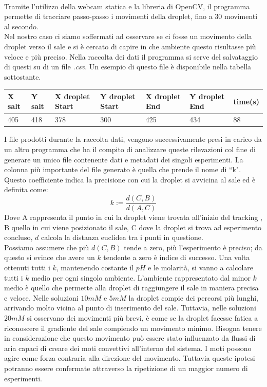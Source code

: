 \\Tramite l'utilizzo della webcam statica e la libreria di OpenCV, il programma permette di tracciare passo-passo i movimenti della droplet, fino a 30 movimenti al secondo. \\Nel nostro caso ci siamo soffermati ad osservare se ci fosse un movimento della droplet verso il sale e si è cercato di capire in che ambiente questo risultasse più veloce e più preciso. Nella raccolta dei dati il programma si serve del salvataggio di questi su di un file \emph{.csv}. Un esempio di questo file è disponibile nella tabella sottostante. 
\begin{center}
\begin{tabular}{lllllll}
X salt & Y salt & X droplet Start & Y droplet Start & X droplet End & Y droplet End & time(s) \\
\hline
405    & 418    & 378             & 300             & 425           & 434           & 88  
\end{tabular}
\end{center}
I file prodotti durante la raccolta dati, vengono successivamente presi in carico da un altro programma che ha il compito di analizzare queste rilevazioni col fine di generare un unico file contenente dati e metadati dei singoli esperimenti. La colonna più importante del file generato è quella che prende il nome di ``k". Questo coefficiente indica la precisione con cui la droplet si avvicina al sale ed è definita come:
\begin{equation} 	
	k := \frac { d(C,B) }{ d(A,C) }
\end{equation}
Dove A rappresenta il punto in cui la droplet viene trovata all'inizio del tracking , B quello in cui viene posizionato il sale, C dove la droplet si trova ad esperimento concluso, $d$ calcola la distanza euclidea tra i punti in questione. 
\\Possiamo assumere che più $d(C,B)$ tende a zero, più l'esperimento è preciso; da questo si evince che avere un $k$ tendente a zero è indice di successo. Una volta ottenuti tutti i $k$, mantenendo costante il $pH$ e le molarità, si vanno a calcolare tutti i $k$ medio per ogni singolo ambiente. L'ambiente rappresentato dal minor $k$ medio è quello che permette alla droplet di raggiungere il sale in maniera precisa e veloce. 
Nelle soluzioni $10mM$ e $5mM$ la droplet compie dei percorsi più lunghi, arrivando molto vicina al punto di inserimento del sale.  Tuttavia, nelle soluzioni $20mM$ si osservano dei movimenti più brevi, è come se la droplet facesse fatica a riconoscere il gradiente del sale compiendo un movimento minimo. Bisogna tenere in considerazione che questo movimento può essere stato influenzato da flussi di aria capaci di creare dei moti convettivi all'interno del sistema. I moti possono agire come forza contraria alla direzione del movimento. Tuttavia queste ipotesi potranno essere confermate attraverso la ripetizione di un maggior numero di esperimenti.
